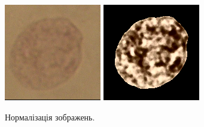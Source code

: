 \begin{figure}[t!]
	\includegraphics[width=0.95\linewidth]{Figures/Chapter2/7e1.png}
	\includegraphics[width=0.95\linewidth]{Figures/Chapter2/7e2.png}
	\endminipage\hfill	
	
	\caption{Нормалізація зображень.}
	\label{fig:normalized_cells}
\end{figure}

